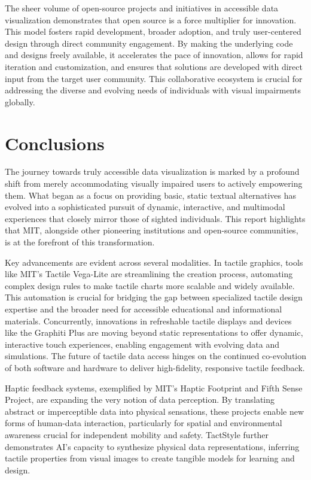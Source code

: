 The sheer volume of open-source projects and initiatives in accessible data visualization demonstrates that open source is a force multiplier for innovation. This model fosters rapid development, broader adoption, and truly user-centered design through direct community engagement. By making the underlying code and designs freely available, it accelerates the pace of innovation, allows for rapid iteration and customization, and ensures that solutions are developed with direct input from the target user community. This collaborative ecosystem is crucial for addressing the diverse and evolving needs of individuals with visual impairments globally.

\section{Conclusions}
The journey towards truly accessible data visualization is marked by a profound shift from merely accommodating visually impaired users to actively empowering them. What began as a focus on providing basic, static textual alternatives has evolved into a sophisticated pursuit of dynamic, interactive, and multimodal experiences that closely mirror those of sighted individuals. This report highlights that MIT, alongside other pioneering institutions and open-source communities, is at the forefront of this transformation.

Key advancements are evident across several modalities. In tactile graphics, tools like MIT's Tactile Vega-Lite are streamlining the creation process, automating complex design rules to make tactile charts more scalable and widely available. This automation is crucial for bridging the gap between specialized tactile design expertise and the broader need for accessible educational and informational materials. Concurrently, innovations in refreshable tactile displays and devices like the Graphiti Plus are moving beyond static representations to offer dynamic, interactive touch experiences, enabling engagement with evolving data and simulations. The future of tactile data access hinges on the continued co-evolution of both software and hardware to deliver high-fidelity, responsive tactile feedback.

Haptic feedback systems, exemplified by MIT's Haptic Footprint and Fifth Sense Project, are expanding the very notion of data perception. By translating abstract or imperceptible data into physical sensations, these projects enable new forms of human-data interaction, particularly for spatial and environmental awareness crucial for independent mobility and safety. TactStyle further demonstrates AI's capacity to synthesize physical data representations, inferring tactile properties from visual images to create tangible models for learning and design.

